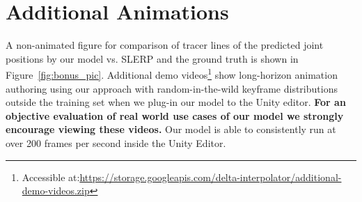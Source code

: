 \documentclass[letterpaper]{article} \usepackage[]{aaai23}  \usepackage{times}  \usepackage{helvet}  \usepackage{courier}  \usepackage[hyphens]{url}  \usepackage{graphicx} \urlstyle{rm} \def\UrlFont{\rm}  \usepackage{natbib}  \usepackage{caption} \frenchspacing  \setlength{\pdfpagewidth}{8.5in} \setlength{\pdfpageheight}{11in}
\begin{document}
\section{Additional Animations} A non-animated figure for comparison of tracer lines of the predicted joint positions by our model vs. SLERP and the ground truth is shown in Figure~\ref{fig:bonus_pic}. Additional demo videos\footnote{Accessible at:\url{https://storage.googleapis.com/delta-interpolator/additional-demo-videos.zip}} show long-horizon animation authoring using our approach with random-in-the-wild keyframe distributions outside the training set when we plug-in our model to the Unity editor. \textbf{For an objective evaluation of real world use cases of our model we strongly encourage viewing these videos.} Our model is able to consistently run at over 200 frames per second inside the Unity Editor.
\end{document}
